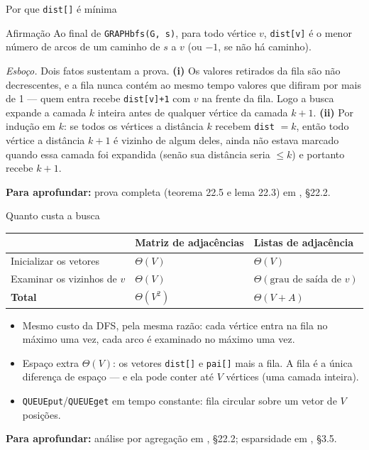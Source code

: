 \documentclass[aspectratio=169]{beamer}
\newcommand{\fonte}[1]{%
  \vfill
  {\tiny\color{gray!55!black}\textbf{Para aprofundar:} #1\par}%
}
\begin{document}
\begin{frame}{Por que \texttt{dist[]} é mínima}
  \begin{block}{Afirmação}
    {\small Ao final de \texttt{GRAPHbfs(G, s)}, para todo vértice $v$,
    \texttt{dist[v]} é o menor número de arcos de um caminho de $s$ a $v$
    (ou $-1$, se não há caminho).}
  \end{block}
  {\scriptsize \emph{Esboço.} Dois fatos sustentam a prova.
  \textbf{(i)} Os valores retirados da fila são não decrescentes, e a fila nunca
  contém ao mesmo tempo valores que difiram por mais de 1 --- quem entra recebe
  \texttt{dist[v]+1} com $v$ na frente da fila. Logo a busca expande a camada $k$
  inteira antes de qualquer vértice da camada $k+1$.
  \textbf{(ii)} Por indução em $k$: se todos os vértices a distância $k$ recebem
  \texttt{dist} $=k$, então todo vértice a distância $k+1$ é vizinho de algum
  deles, ainda não estava marcado quando essa camada foi expandida (senão sua
  distância seria $\le k$) e portanto recebe $k+1$.}
  \fonte{prova completa (teorema 22.5 e lema 22.3) em
  \cite{cormen2009introduction}, §22.2.}
\end{frame}

\begin{frame}{Quanto custa a busca}
  \begin{center}
  {\small
  \begin{tabular}{lll}
    \toprule
    & \textbf{Matriz de adjacências} & \textbf{Listas de adjacência} \\
    \midrule
    Inicializar os vetores       & $\Theta(V)$   & $\Theta(V)$ \\
    Examinar os vizinhos de $v$  & $\Theta(V)$   & $\Theta(\text{grau de saída de } v)$ \\
    \textbf{Total}               & $\Theta(V^2)$ & $\Theta(V + A)$ \\
    \bottomrule
  \end{tabular}}
  \end{center}
  \medskip
  {\small
  \begin{itemize}\small
    \item Mesmo custo da DFS, pela mesma razão: cada vértice entra na fila no
          máximo uma vez, cada arco é examinado no máximo uma vez.
    \item Espaço extra $\Theta(V)$: os vetores \texttt{dist[]} e \texttt{pai[]}
          mais a fila. A fila é a única diferença de espaço --- e ela pode
          conter até $V$ vértices (uma camada inteira).
    \item \texttt{QUEUEput}/\texttt{QUEUEget} em tempo constante: fila
          circular sobre um vetor de $V$ posições.
  \end{itemize}}
  \fonte{análise por agregação em \cite{cormen2009introduction}, §22.2;
  esparsidade em \cite{levitin2012introduction}, §3.5.}
\end{frame}
\end{document}
